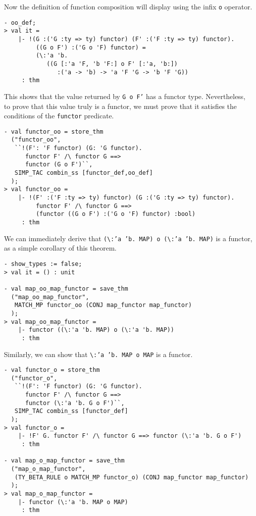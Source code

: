 Now the definition of function composition will display using the
infix \texttt{o} operator.
%
\begin{session}
\begin{verbatim}
- oo_def;
> val it =
    |- !(G :('G :ty => ty) functor) (F' :('F :ty => ty) functor).
         ((G o F') :('G o 'F) functor) =
         (\:'a 'b.
            ((G [:'a 'F, 'b 'F:] o F' [:'a, 'b:])
               :('a -> 'b) -> 'a 'F 'G -> 'b 'F 'G))
     : thm
\end{verbatim}
\end{session}

This shows that the value returned by \texttt{G o F'} has a functor type.
Nevertheless, to prove that this value truly is a functor, we must prove that it
satisfies the conditions of the \texttt{functor} predicate.
%
\begin{session}
\begin{verbatim}
- val functor_oo = store_thm
  ("functor_oo",
   ``!(F': 'F functor) (G: 'G functor).
      functor F' /\ functor G ==>
      functor (G o F')``,
   SIMP_TAC combin_ss [functor_def,oo_def]
  );
> val functor_oo =
    |- !(F' :('F :ty => ty) functor) (G :('G :ty => ty) functor).
         functor F' /\ functor G ==>
         (functor ((G o F') :('G o 'F) functor) :bool)
     : thm
\end{verbatim}
\end{session}

We can immediately derive that
\texttt{(}\verb|\|\texttt{:'a~'b.~MAP)~o (}\verb|\|\texttt{:'a~'b.~MAP)} is
a functor, as a simple corollary of this theorem.

\begin{session}
\begin{verbatim}
- show_types := false;
> val it = () : unit

- val map_oo_map_functor = save_thm
  ("map_oo_map_functor",
   MATCH_MP functor_oo (CONJ map_functor map_functor)
  );
> val map_oo_map_functor =
    |- functor ((\:'a 'b. MAP) o (\:'a 'b. MAP))
     : thm
\end{verbatim}
\end{session}

Similarly, we can show that \verb|\|\texttt{:'a~'b.~MAP~o~MAP} is a functor.
\begin{session}
\begin{verbatim}
- val functor_o = store_thm
  ("functor_o",
   ``!(F': 'F functor) (G: 'G functor).
      functor F' /\ functor G ==>
      functor (\:'a 'b. G o F')``,
   SIMP_TAC combin_ss [functor_def]
  );
> val functor_o =
    |- !F' G. functor F' /\ functor G ==> functor (\:'a 'b. G o F')
     : thm

- val map_o_map_functor = save_thm
  ("map_o_map_functor",
   (TY_BETA_RULE o MATCH_MP functor_o) (CONJ map_functor map_functor)
  );
> val map_o_map_functor =
    |- functor (\:'a 'b. MAP o MAP)
     : thm
\end{verbatim}
\end{session}


